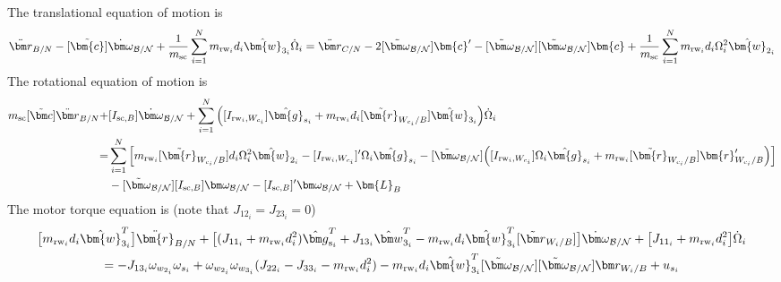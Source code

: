 The translational equation of motion is
\begin{equation}
\ddot{\bm r}_{B/N} -[\tilde{\bm{c}}]\dot{\bm\omega}_{\cal B/N} +\frac{1}{m_{\text{sc}}}\sum\limits_{i=1}^{N}m_{\text{rw}_i}d_i\hat{\bm{w}}_{3_i}\dot{\Omega}_i = \ddot{\bm r}_{C/N}   - 2[\tilde{\bm\omega}_{\cal B/N}]\bm{c}'-[\tilde{\bm\omega}_{\cal B/N}][\tilde{\bm\omega}_{\cal B/N}]\bm{c} + \frac{1}{m_{\text{sc}}}\sum\limits_{i=1}^{N}m_{\text{rw}_i}d_i\Omega_i^2\hat{\bm{w}}_{2_i}
\label{eq:rBddot}
\end{equation}
The rotational equation of motion is
\begin{equation}
\begin{split}
m_{\text{sc}}[\tilde{\bm c}]\ddot{\bm r}_{B/N} +& [I_{\text{sc},B}]\dot{\bm\omega}_{\cal B/N} +\sum\limits_{i=1}^{N}\Big([I_{\text{rw}_i,W_{c_i}}]\hat{\bm{g}}_{s_i} + m_{\text{rw}_i}d_i[\tilde{\bm{r}}_{W_{c_i}/B}]\hat{\bm{w}}_{3_i}\Big)\dot{\Omega}_i
\\=&
\sum\limits_{i=1}^{N}\Big[ m_{\text{rw}_i}[\tilde{\bm{r}}_{W_{c_i}/B}]d_i \Omega_i^2\hat{\bm{w}}_{2_i}-[I_{\text{rw}_i,W_{c_i}}]'\Omega_i \hat{\bm{g}}_{s_i} -[\tilde{\bm\omega}_{\cal B/N}]\Big([I_{\text{rw}_i,W_{c_i}}]\Omega_i \hat{\bm{g}}_{s_i}+ m_{\text{rw}_i}[\tilde{\bm{r}}_{W_{c_i}/B}]\bm{r}'_{W_{c_i}/B}\Big)\Big]
\\&  -[\tilde{\bm\omega}_{\cal B/N}][I_{\text{sc},B}]\bm\omega_{\cal B/N}-  [I_{\text{sc},B}]'\bm\omega_{\cal B/N} + \bm{L}_B
\end{split}
\label{eq:rotationalEOM}
\end{equation}
The motor torque equation is (note that $J_{12_i} = J_{23_i} = 0$)
\begin{multline}
\big[m_{\text{rw}_i} d_i \hat{\bm{w}}_{3_i}^T\big]\ddot{\bm{r}}_{B/N} + \big[(J_{11_i} + m_{\text{rw}_i} d_i^2)\hat{\bm g}_{\text{s}_i}^T  + J_{13_i}\hat{\bm w}_{3_i}^T -m_{\text{rw}_i} d_i \hat{\bm{w}}_{3_i}^T [\tilde{\bm r}_{W_i/B}]\big]\dot{\bm\omega}_{\cal B/N} + \big[J_{11_i} + m_{\text{rw}_i} d_i^2\big]\dot{\Omega}_i
\\=   - J_{13_i} \omega_{w_{2_i}}\omega_{s_i}
+ \omega_{w_{2_i}} \omega_{w_{3_i}} (J_{22_i} - J_{33_i} - m_{\text{rw}_i} d_i^2
)
-m_{\text{rw}_i} d_i \hat{\bm{w}}_{3_i}^T [\tilde{\bm\omega}_{\cal B/N}] [\tilde{\bm\omega}_{\cal B/N}] \bm r_{W_i/B} + u_{s_i}
\label{eq:motorTorqueFinal}
\end{multline}

